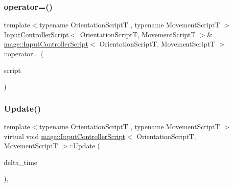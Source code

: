 \hypertarget{classmage_1_1_input_controller_script_a2e2231433ec17577ce019348285eaba3}{}\label{classmage_1_1_input_controller_script_a2e2231433ec17577ce019348285eaba3} 
\subsubsection{\texorpdfstring{operator=()}{operator=()}\hspace{0.1cm}{\footnotesize\ttfamily [2/2]}}
{\footnotesize\ttfamily template$<$typename Orientation\+ScriptT , typename Movement\+ScriptT $>$ \\
\hyperlink{classmage_1_1_input_controller_script}{Input\+Controller\+Script}$<$ Orientation\+ScriptT, Movement\+ScriptT $>$\& \hyperlink{classmage_1_1_input_controller_script}{mage\+::\+Input\+Controller\+Script}$<$ Orientation\+ScriptT, Movement\+ScriptT $>$\+::operator= (\begin{DoxyParamCaption}\item[{\hyperlink{classmage_1_1_input_controller_script}{Input\+Controller\+Script}$<$ Orientation\+ScriptT, Movement\+ScriptT $>$ \&\&}]{script }\end{DoxyParamCaption})\hspace{0.3cm}{\ttfamily [delete]}}

\hypertarget{classmage_1_1_input_controller_script_ae964c7b2c90fa2addb32562921376c80}{}\label{classmage_1_1_input_controller_script_ae964c7b2c90fa2addb32562921376c80} 
\subsubsection{\texorpdfstring{Update()}{Update()}}
{\footnotesize\ttfamily template$<$typename Orientation\+ScriptT , typename Movement\+ScriptT $>$ \\
virtual void \hyperlink{classmage_1_1_input_controller_script}{mage\+::\+Input\+Controller\+Script}$<$ Orientation\+ScriptT, Movement\+ScriptT $>$\+::Update (\begin{DoxyParamCaption}\item[{\mbox{[}\mbox{[}maybe\+\_\+unused\mbox{]} \mbox{]} \hyperlink{namespacemage_ad26233bbec640deda836e572c1a23708}{F64}}]{delta\+\_\+time }\end{DoxyParamCaption})\hspace{0.3cm}{\ttfamily [override]}, {\ttfamily [virtual]}}

